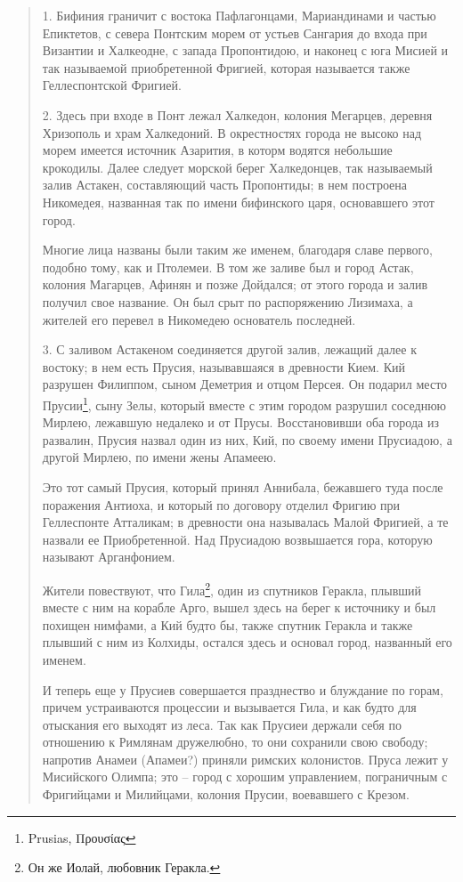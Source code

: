 \begin{quotation}
1. Бифиния граничит с востока Пафлагонцами, Мариандинами и частью Епиктетов, с севера Понтским морем от устьев Сангария до входа при Византии и Халкеодне, с запада Пропонтидою, и наконец с юга Мисией и так называемой приобретенной Фригией, которая называется также Геллеспонтской Фригией.

2. Здесь при входе в Понт лежал Халкедон, колония Мегарцев, деревня Хризополь и храм Халкедоний. В окрестностях города не высоко над морем имеется источник Азарития, в которм водятся небольшие крокодилы. Далее следует морской берег Халкедонцев, так называемый залив Астакен, составляющий часть Пропонтиды; в нем построена Никомедея, названная так по имени бифинского царя, основавшего этот город.

Многие лица названы были таким же именем, благодаря  славе первого, подобно тому, как и Птолемеи. В том же заливе был и город Астак, колония Магарцев, Афинян и позже Дойдался; от этого города и залив получил свое название. Он был срыт по распоряжению Лизимаха, а жителей его перевел в Никомедею основатель последней.

3. С заливом Астакеном соединяется другой залив, лежащий далее к востоку; в нем есть Прусия, называвшаяся в древности Кием. Кий разрушен Филиппом, сыном Деметрия и отцом Персея. Он подарил место Прусии\footnote{Prusias, Προυσίας}, сыну Зелы, который вместе с этим городом разрушил соседнюю Мирлею, лежавшую недалеко и от Прусы. Восстановивши оба города из развалин, Прусия назвал один из них, Кий, по своему имени Прусиадою, а другой Мирлею, по имени жены Апамеею. 

Это тот самый Прусия, который принял Аннибала, бежавшего туда после поражения Антиоха, и который по договору отделил Фригию при Геллеспонте Атталикам; в древности она называлась Малой Фригией, а те назвали ее Приобретенной. Над Прусиадою возвышается гора, которую называют Арганфонием. 

Жители повествуют, что Гила\footnote{Он же Иолай, любовник Геракла.}, один из спутников Геракла, плывший вместе с ним на корабле Арго, вышел здесь на берег к источнику и был похищен нимфами, а Кий будто бы, также спутник Геракла и также плывший с ним из Колхиды, остался здесь и основал город, названный его именем. 

И теперь еще у Прусиев совершается празднество и блуждание по горам, причем устраиваются процессии и вызывается Гила, и как будто для отыскания его выходят из леса. Так как Прусиеи держали себя по отношению к Римлянам дружелюбно, то они сохранили свою свободу; напротив Анамеи (Апамеи?) приняли римских колонистов. Пруса лежит у Мисийского Олимпа; это – город с хорошим управлением, пограничным с Фригийцами и Милийцами, колония Прусии, воевавшего с Крезом.
\end{quotation}

